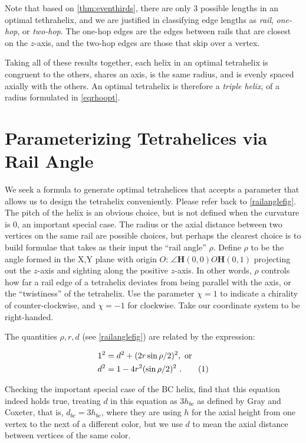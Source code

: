 \documentclass[10pt,final]{journals-1.0/asme2ej}
\newcommand\numberthis{\addtocounter{equation}{1}\tag{\theequation}}
\renewcommand{\vec}[1]{\mathbf{#1}}
\begin{document}
 Note that based on \cref{thm:eventhirds}, there are only 3 possible lengths in an optimal tethrahelix,
 and we are justified in classifying edge lengths as \emph{rail}, \emph{one-hop}, or
\emph{two-hop}. The one-hop edges are the edges between rails that are closest on the $z$-axis, and the two-hop edges are those that skip over a vertex.


Taking all of these results together, 
each helix in an optimal tetrahelix is congruent to the others, shares an axis, is the same radius, and is evenly spaced
axially with the others.
An optimal tetrahelix is therefore a \emph{triple helix}, of a radius formulated in \cref{eqrhoopt}.

\section{Parameterizing Tetrahelices via Rail Angle}
\label{sec:parameterizing}

We seek a formula to generate optimal tetrahelices that accepts a
parameter that allows us to design the tetrahelix conveniently.
Please refer back to \cref{railanglefig}.
The pitch of the helix is an obvious choice, but is not defined when the
curvature is $0$, an important special case. The radius or the axial
distance between two vertices on the same rail are possible choices, but
perhaps the clearest choice is to build formulae that takes as their
input the ``rail angle'' $\rho$. Define $\rho$ to be the angle
formed in the X,Y plane with origin $O$: $\angle \vec{H}(0,0) O \vec{H}(0,1)$ projecting out the
$z$-axis and sighting along the positive $z$-axis. In other words, $\rho$
controls how far a rail edge of a tetrahelix deviates from being
parallel with the axis, or the ``twistiness'' of the tetrahelix. Use
the parameter $\chi = 1$ to indicate a chirality of counter-clockwise,
and $\chi = -1$ for clockwise. Take our coordinate system to be right-handed.

The quantities $\rho,r,d$ (see \cref{railanglefig}) are related by the expression:

\begin{align*}
  1^2 &= d^2 + (2 r \sin{ \rho / 2})^2 , \text{ or }\\
  d^2 &= 1 - 4 r^2 (\sin{ \rho / 2})^2  \text{ .}  \numberthis  \label{railangle} \\
\end{align*}

Checking the important special case of the BC helix, find that this equation
indeed holds true, treating $d$ in this equation as $3 h_{bc}$ as defined by
Gray and Coxeter, that is, $d_{bc} = 3h_{bc}$, where they are using
$h$ for the axial height from one vertex to
the next of a different color, but we use $d$ to mean the axial distance between vertices of
the  same color.
\end{document}
